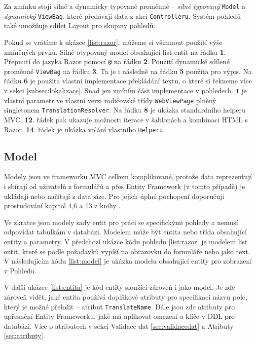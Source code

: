 \documentclass[11pt,twoside,a4paper]{book}
\begin{document}
Za zmínku stojí silně a dynamicky typované proměnné -- \textit{silně typovaný} \texttt{Model} a \textit{dynamický} \texttt{ViewBag}, které předávají data z akcí \texttt{Controlleru}. Systém pohledů také umožňuje sdílet \textsf{Layout} pro skupiny pohledů.

Pokud se vrátíme k ukázce \ref{list:razor}, můžeme si všimnout použití výše zmíněných prvků. Silně otypovaný model obsahující list entit na řádku \textbf{1}. Přepnutí do jazyka \textsf{Razor} pomocí \texttt{@} na řádku \textbf{2}. Použití dynamické sdílené proměnné \texttt{ViewBag} na řádku \textbf{3}. Ta je i následně na řádku \textbf{5} použita pro výpis. Na řádku \textbf{6} je použita vlastní implementace překládání textu, o které si řekneme více v sekci \ref{subsec:lokalizace}. Snad jen zmíním část implementace v pohledech. \texttt{T} je vlastní parametr ve vlastní verzi rodičovské třídy \texttt{WebViewPage} plněný singletonem \texttt{TranslationResolver}. Na řádku \textbf{8} je ukázka standardního helperu MVC. \textbf{12}. řádek pak ukazuje možnosti iterace v šablonách a kombinaci HTML s \textsf{Razor}. \textbf{14}. řádek je ukázka volání vlastního \texttt{Helperu}.

\subsection{Model}
Modely jsou ve frameworku MVC celkem komplikované, protože data reprezentují i sbírají od uživatelů z formulářů a přes Entity Framework (v tomto případě) je ukládají nebo načítají z databáze. Pro jejich úplné pochopení doporučuji prostudování kapitol 4,6 a 13 z knihy \cite{MVC1}.

Ve zkratce jsou modely sady entit pro práci se specifickými \textsf{pohledy} a nemusí  odpovídat tabulkám v databázi. Modelem může být entita nebo třída obsahující entity a parametry. V předchozí ukázce kódu \textsf{pohledu} \ref{list:razor} je modelem list entit, které se podle požadavků vypíší na obrazovku do formuláře nebo jako text. V následujícím kódu \ref{list:model} je ukázka modelu obsahující entity pro zobrazení v \textsf{Pohledu}. 

V další ukázce \ref{list:entita} je kód entity sloužící zároveň i jako model. Je zde zároveň vidět, jaké entita používá doplňkové \textsf{atributy} pro specifikaci názvu pole, který je možné přeložit -- atribut \texttt{TranslateName}. Dále jsou zde atributy pro upřesnění Entity Frameworku, jaké má  aplikovat omezení a klíče v DDL pro databázi. Více o atributech v sekci Validace dat \ref{sec:validacedat} a Atributy \ref{sec:atributy}.
\end{document}
